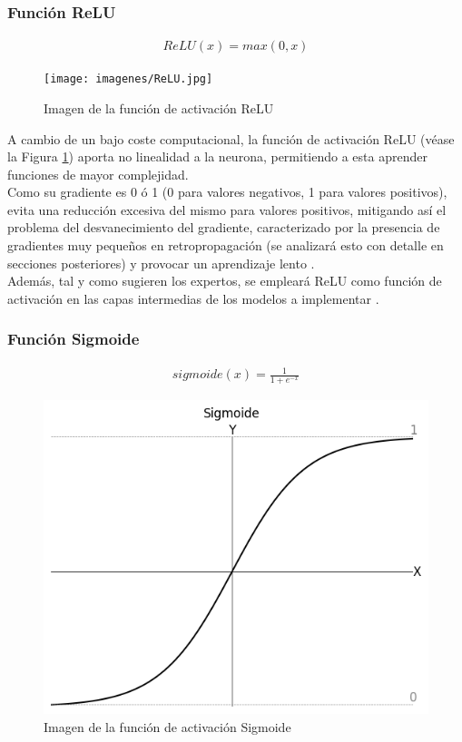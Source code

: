 \subsubsection{Función ReLU}

\begin{gather}
	ReLU(x) = max(0, x)
\end{gather}

\begin{figure}[H]
	\centering
	\texttt{[image: imagenes/ReLU.jpg]}  
	\caption{Imagen de la función de activación ReLU}
	\label{fig:ReLU}
\end{figure}

A cambio de un bajo coste computacional, la función de activación ReLU (véase la Figura \ref{fig:ReLU}) aporta no linealidad a la neurona, permitiendo a esta aprender funciones de mayor complejidad. \\
Como su gradiente es 0 ó 1 (0 para valores negativos, 1 para valores positivos), evita una reducción excesiva del mismo para valores positivos, mitigando así el problema del desvanecimiento del gradiente, caracterizado por la presencia de gradientes muy pequeños en retropropagación (se analizará esto con detalle en secciones posteriores) y provocar un aprendizaje lento \cite{ReLU}. \\
Además, tal y como sugieren los expertos, se empleará ReLU como función de activación en las capas intermedias de los modelos a implementar \cite{importancia_ReLU} \cite{importancia_ReLU_2}. 

\subsubsection{Función Sigmoide}

\begin{gather}
	sigmoide(x) = \frac{1}{1+e^{-x}}
\end{gather}

\begin{figure}[H]
	\centering
	\includegraphics[scale=0.45]{imagenes/sigmoide.jpg}  
	\caption{Imagen de la función de activación Sigmoide}
	\label{fig:Sigmoide}
\end{figure}

